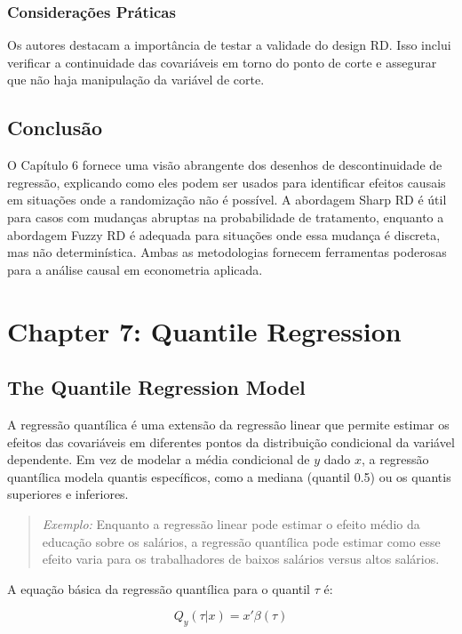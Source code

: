 \documentclass[a4paper,12pt]{article}[abntex2]
\begin{document}
\subsubsection{Considerações Práticas}
Os autores destacam a importância de testar a validade do design RD. Isso inclui verificar a continuidade das covariáveis em torno do ponto de corte e assegurar que não haja manipulação da variável de corte.

\subsection{Conclusão}
O Capítulo 6 fornece uma visão abrangente dos desenhos de descontinuidade de regressão, explicando como eles podem ser usados para identificar efeitos causais em situações onde a randomização não é possível. A abordagem Sharp RD é útil para casos com mudanças abruptas na probabilidade de tratamento, enquanto a abordagem Fuzzy RD é adequada para situações onde essa mudança é discreta, mas não determinística. Ambas as metodologias fornecem ferramentas poderosas para a análise causal em econometria aplicada.

\newpage

\section{Chapter 7: Quantile Regression}

\subsection{The Quantile Regression Model}
A regressão quantílica é uma extensão da regressão linear que permite estimar os efeitos das covariáveis em diferentes pontos da distribuição condicional da variável dependente. Em vez de modelar a média condicional de \( y \) dado \( x \), a regressão quantílica modela quantis específicos, como a mediana (quantil 0.5) ou os quantis superiores e inferiores.

\begin{quote}
\textit{Exemplo:} Enquanto a regressão linear pode estimar o efeito médio da educação sobre os salários, a regressão quantílica pode estimar como esse efeito varia para os trabalhadores de baixos salários versus altos salários.
\end{quote}

A equação básica da regressão quantílica para o quantil \( \tau \) é:

\begin{equation}
Q_y(\tau | x) = x'\beta(\tau)
\end{equation}
\end{document}
